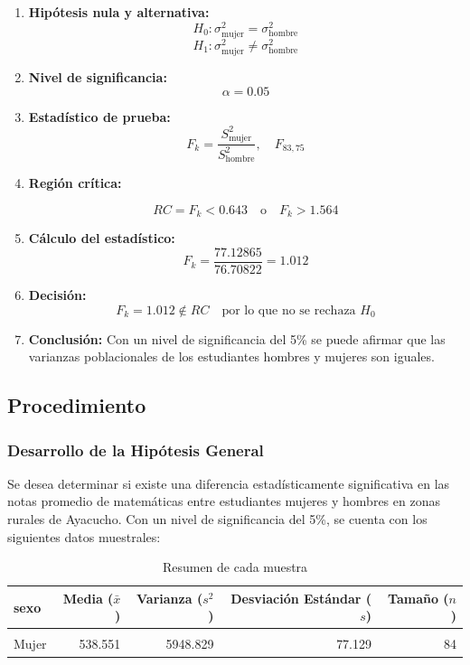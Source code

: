 \documentclass[
]{article}
\begin{document}
\begin{enumerate}
  \item \textbf{Hipótesis nula y alternativa:}
    \[
    H_0: \sigma^2_{\text{mujer}} = \sigma^2_{\text{hombre}}
    \]
    \[
    H_1: \sigma^2_{\text{mujer}} \neq \sigma^2_{\text{hombre}}
    \]
  \item \textbf{Nivel de significancia:}
    \[
    \alpha = 0.05
    \]

  \item \textbf{Estadístico de prueba:}
    \[
    F_k = \frac{S^2_{\text{mujer}}}{S^2_{\text{hombre}}}, \quad F_{83, 75}
    \]

  \item \textbf{Región crítica:}
  
   \[
    RC = F_k < 0.643 \quad \text{o} \quad F_k > 1.564
    \]

  \item \textbf{Cálculo del estadístico:}
    \[
    F_k = \frac{77.12865}{76.70822} = 1.012
    \]

  \item \textbf{Decisión:}
    \[
    F_k = 1.012 \notin RC \quad \text{por lo que no se rechaza } H_0
    \]

  \item \textbf{Conclusión:}
    Con un nivel de significancia del 5\% se puede afirmar que las varianzas poblacionales de los estudiantes hombres y mujeres son iguales.
\end{enumerate}

\subsection*{Procedimiento}\label{procedimiento}

\subsubsection*{Desarrollo de la Hipótesis
General}\label{desarrollo-de-la-hipuxf3tesis-general}

Se desea determinar si existe una diferencia estadísticamente
significativa en las notas promedio de matemáticas entre estudiantes
mujeres y hombres en zonas rurales de Ayacucho. Con un nivel de
significancia del 5\%, se cuenta con los siguientes datos muestrales:

\begin{table}[!h]
\centering
\caption{\label{tab:unnamed-chunk-9}Resumen de cada muestra}
\centering
\begin{tabular}[t]{lrrrr}
\toprule
sexo & Media (\(\bar{x}\)) & Varianza (\(s^{2}\)) & Desviación Estándar (\(s\)) & Tamaño (\(n\))\\
\midrule
\cellcolor{gray!10}{Hombre} & \cellcolor{gray!10}{553.216} & \cellcolor{gray!10}{5884.149} & \cellcolor{gray!10}{76.708} & \cellcolor{gray!10}{76}\\
Mujer & 538.551 & 5948.829 & 77.129 & 84\\
\bottomrule
\end{tabular}
\end{table}
\end{document}
